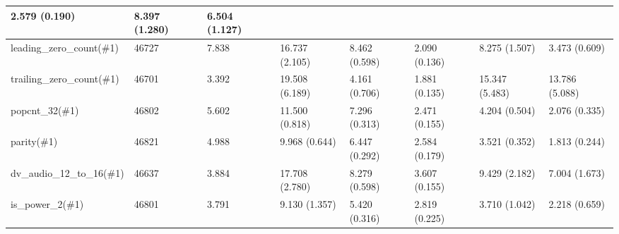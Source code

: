 \begin{table*}[]
\begin{tabular}{@{}llllllll@{}}
										\multicolumn{1}{l}{2.579 (0.190)} &
										\multicolumn{1}{l}{8.397 (1.280)} &
										\multicolumn{1}{l}{6.504 (1.127)} \\ \midrule
										\multicolumn{1}{l}{leading\_zero\_count(\#1)} &
										\multicolumn{1}{l}{46727} &
										\multicolumn{1}{l}{7.838} &
										\multicolumn{1}{l}{16.737 (2.105)} &
										\multicolumn{1}{l}{8.462 (0.598)} &
										\multicolumn{1}{l}{2.090 (0.136)} &
										\multicolumn{1}{l}{8.275 (1.507)} &
										\multicolumn{1}{l}{3.473 (0.609)} \\ \midrule
										\multicolumn{1}{l}{trailing\_zero\_count(\#1)} &
										\multicolumn{1}{l}{46701} &
										\multicolumn{1}{l}{3.392} &
										\multicolumn{1}{l}{19.508 (6.189)} &
										\multicolumn{1}{l}{4.161 (0.706)} &
										\multicolumn{1}{l}{1.881 (0.135)} &
										\multicolumn{1}{l}{15.347 (5.483)} &
										\multicolumn{1}{l}{13.786 (5.088)} \\ \midrule
										\multicolumn{1}{l}{popcnt\_32(\#1)} &
										\multicolumn{1}{l}{46802} &
										\multicolumn{1}{l}{5.602} &
										\multicolumn{1}{l}{11.500 (0.818)} &
										\multicolumn{1}{l}{7.296 (0.313)} &
										\multicolumn{1}{l}{2.471 (0.155)} &
										\multicolumn{1}{l}{4.204 (0.504)} &
										\multicolumn{1}{l}{2.076 (0.335)} \\ \midrule
										\multicolumn{1}{l}{parity(\#1)} &
										\multicolumn{1}{l}{46821} &
										\multicolumn{1}{l}{4.988} &
										\multicolumn{1}{l}{9.968 (0.644)} &
										\multicolumn{1}{l}{6.447 (0.292)} &
										\multicolumn{1}{l}{2.584 (0.179)} &
										\multicolumn{1}{l}{3.521 (0.352)} &
										\multicolumn{1}{l}{1.813 (0.244)} \\ \midrule
										\multicolumn{1}{l}{dv\_audio\_12\_to\_16(\#1)} &
										\multicolumn{1}{l}{46637} &
										\multicolumn{1}{l}{3.884} &
										\multicolumn{1}{l}{17.708 (2.780)} &
										\multicolumn{1}{l}{8.279 (0.598)} &
										\multicolumn{1}{l}{3.607 (0.155)} &
										\multicolumn{1}{l}{9.429 (2.182)} &
										\multicolumn{1}{l}{7.004 (1.673)} \\ \midrule
										\multicolumn{1}{l}{is\_power\_2(\#1)} &
										\multicolumn{1}{l}{46801} &
										\multicolumn{1}{l}{3.791} &
										\multicolumn{1}{l}{9.130 (1.357)} &
										\multicolumn{1}{l}{5.420 (0.316)} &
										\multicolumn{1}{l}{2.819 (0.225)} &
										\multicolumn{1}{l}{3.710 (1.042)} &
										\multicolumn{1}{l}{2.218 (0.659)} \\ \midrule

\end{tabular}
\end{table*}

